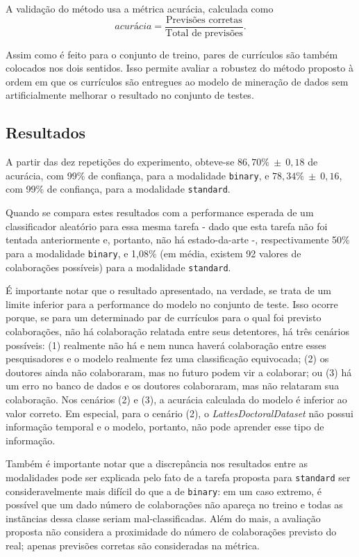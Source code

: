 \documentclass[12pt]{article}
\begin{document}
A validação do método usa a métrica acurácia, calculada como
\begin{equation}
  \textit{acurácia} = \frac{\text{Previsões corretas}}{\text{Total de previsões}}.
\end{equation}

Assim como é feito para o conjunto de treino, pares de currículos são também colocados nos dois sentidos.
Isso permite avaliar a robustez do método proposto à ordem em que os currículos são entregues ao modelo de mineração de dados sem artificialmente melhorar o resultado no conjunto de testes.

\subsection{Resultados}
\label{sec:results}
A partir das dez repetições do experimento, obteve-se $86,70\%~\pm~0,18$ de acurácia, com 99\% de confiança, para a modalidade \texttt{binary}, e $78,34\%~\pm~0,16$, com 99\% de confiança, para a modalidade \texttt{standard}.

Quando se compara estes resultados com a performance esperada de um classificador aleatório para essa mesma tarefa - dado que esta tarefa não foi tentada anteriormente e, portanto, não há estado-da-arte -, respectivamente 50\% para a modalidade \texttt{binary}, e 1,08\% (em média, existem 92 valores de colaborações possíveis) para a modalidade \texttt{standard}.

É importante notar que o resultado apresentado, na verdade, se trata de um limite inferior para a performance do modelo no conjunto de teste.
Isso ocorre porque, se para um determinado par de currículos para o qual foi previsto colaborações, não há colaboração relatada entre seus detentores, há três cenários possíveis: (1) realmente não há e nem nunca haverá colaboração entre esses pesquisadores e o modelo realmente fez uma classificação equivocada; (2) os doutores ainda não colaboraram, mas no futuro podem vir a colaborar; ou (3) há um erro no banco de dados e os doutores colaboraram, mas não relataram sua colaboração.
Nos cenários (2) e (3), a acurácia calculada do modelo é inferior ao valor correto.
Em especial, para o cenário (2), o \emph{LattesDoctoralDataset} não possui informação temporal e o modelo, portanto, não pode aprender esse tipo de informação.

Também é importante notar que a discrepância nos resultados entre as modalidades pode ser explicada pelo fato de a tarefa proposta para \texttt{standard} ser consideravelmente mais difícil do que a de \texttt{binary}: em um caso extremo, é possível que um dado número de colaborações não apareça no treino e todas as instãncias dessa classe seriam mal-classificadas.
Além do mais, a avaliação proposta não considera a proximidade do número de colaborações previsto do real; apenas previsões corretas são consideradas na métrica.
\end{document}
